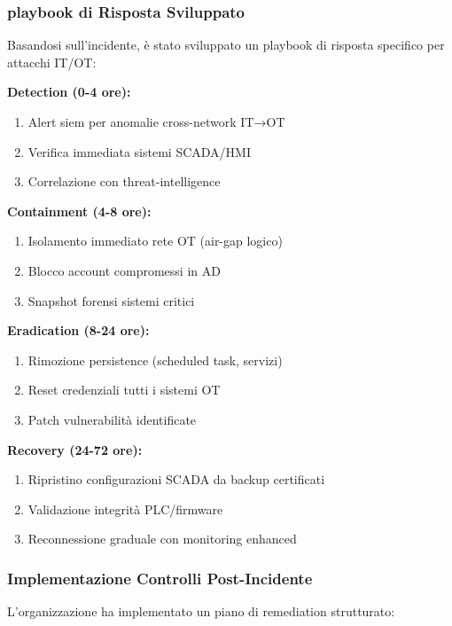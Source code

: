 \subsubsection{\gls{playbook} di Risposta Sviluppato}

Basandosi sull'incidente, è stato sviluppato un \gls{playbook} di risposta specifico per attacchi IT/OT:

\textbf{Detection (0-4 ore):}
\begin{enumerate}
    \item Alert \gls{siem} per anomalie cross-network IT→OT
    \item Verifica immediata sistemi SCADA/HMI
    \item Correlazione con \gls{threat-intelligence}
\end{enumerate}

\textbf{Containment (4-8 ore):}
\begin{enumerate}
    \item Isolamento immediato rete OT (air-gap logico)
    \item Blocco account compromessi in AD
    \item Snapshot forensi sistemi critici
\end{enumerate}

\textbf{Eradication (8-24 ore):}
\begin{enumerate}
    \item Rimozione persistence (scheduled task, servizi)
    \item Reset credenziali tutti i sistemi OT
    \item Patch vulnerabilità identificate
\end{enumerate}

\textbf{Recovery (24-72 ore):}
\begin{enumerate}
    \item Ripristino configurazioni SCADA da backup certificati
    \item Validazione integrità PLC/firmware
    \item Reconnessione graduale con monitoring enhanced
\end{enumerate}

\subsubsection{Implementazione Controlli Post-Incidente}

L'organizzazione ha implementato un piano di remediation strutturato:

